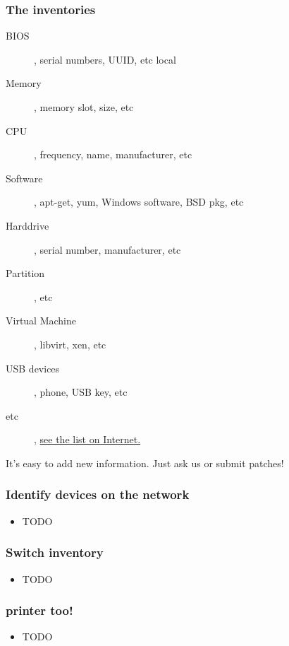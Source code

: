 \begin{frame}
    \frametitle{The inventories}

    \begin{description}
        \item[BIOS], serial numbers, UUID, etc local
        \item[Memory], memory slot, size, etc
        \item[CPU], frequency, name, manufacturer, etc
        \item[Software], apt-get, yum, Windows software, BSD pkg, etc
        \item[Harddrive], serial number, manufacturer, etc
        \item[Partition], etc
        \item[Virtual Machine], libvirt, xen, etc
        \item[USB devices], phone, USB key, etc
        \item[etc], \href{http://search.cpan.org/dist/FusionInventory-Agent/lib/FusionInventory/Agent/XML/Query/Inventory.pm}{see the list on Internet.}
    \end{description}

    It's easy to add new information. Just ask us or submit patches!

\end{frame}

\begin{frame}
    \frametitle{Identify devices on the network}

    \begin{itemize}
        \item TODO
    \end{itemize}
\end{frame}

\begin{frame}
    \frametitle{Switch inventory}

    \begin{itemize}
        \item TODO
    \end{itemize}
\end{frame}

\begin{frame}
    \frametitle{printer too!}

    \begin{itemize}
        \item TODO
    \end{itemize}
\end{frame}

